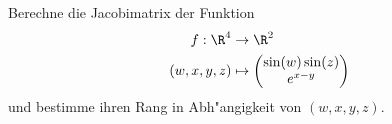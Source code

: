 \begin{prob}
Berechne die Jacobimatrix der Funktion 
    \begin{equation*}
        \begin{split}
            f:\R^4&\to\R^2\\
            (w,x,y,z)&\mapsto 
            \begin{pmatrix}
            \sin(w)\sin(z)\\
            e^{x-y}
            \end{pmatrix}
        \end{split}
    \end{equation*}
    und bestimme ihren Rang in Abh"angigkeit von $(w,x,y,z)$.
\end{prob}
